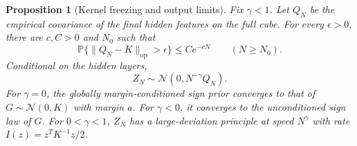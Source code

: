 \documentclass[11pt]{article}
\newtheorem{proposition}[theorem]{Proposition}
\theoremstyle{remark}
\newcommand{\Prb}{\mathbb P}
\begin{document}
\begin{proposition}[Kernel freezing and output limits]
\label{prop:kernel-limit}
Fix $\gamma<1$. Let $Q_N$ be the empirical covariance of the final
hidden features on the full cube. For every $\epsilon>0$, there
are $c,C>0$ and $N_0$ such that
\begin{equation}\label{eq:freezing}
 \Prb\{\|Q_N-K\|_{\mathrm{op}}>\epsilon\}\le Ce^{-cN}
 \qquad(N\ge N_0).
\end{equation}
Conditional on the hidden layers,
\begin{equation}\label{eq:output-covariance}
 Z_N\sim\mathcal N(0,N^{-\gamma}Q_N).
\end{equation}
For $\gamma=0$, the globally margin-conditioned sign prior
converges to that of $G\sim\mathcal N(0,K)$ with margin $a$.
For $\gamma<0$, it converges to the unconditioned sign law of $G$.
For $0<\gamma<1$, $Z_N$ has a large-deviation principle at speed
$N^\gamma$ with rate $I(z)=z^TK^{-1}z/2$.
\end{proposition}
\end{document}
